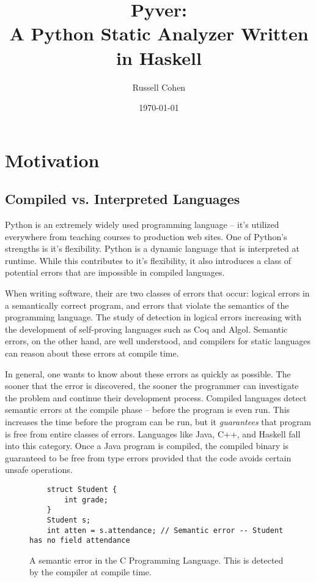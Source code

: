 \documentclass{article}[12pt]
\author{Russell Cohen}
\title{Pyver: \\ A Python Static Analyzer Written in Haskell}
\date{\today}
\begin{document}
\renewcommand{\theFancyVerbLine}{
      \sffamily\textcolor[rgb]{0.5,0.5,0.5}{\scriptsize\arabic{FancyVerbLine}}}

\maketitle
\section{Motivation}

\subsection{Compiled vs. Interpreted Languages}
\doublespacing
Python is an extremely widely used programming language -- it's utilized everywhere from teaching courses to production
web sites. One of Python's strengths is it's flexibility. Python is a dynamic language that is
interpreted at runtime. While this contributes to it's flexibility, it also introduces a class of
potential errors that are impossible in compiled languages.

When writing software, their are two classes of errors that occur: logical errors in a semantically
correct program, and errors that violate the semantics of the programming language. The study of
detection in logical errors increasing with the development of self-proving languages such as Coq
and Algol. Semantic errors, on the other hand, are well understood, and compilers for static
languages can reason about these errors at compile time. 

In general, one wants to know about these errors as quickly as possible. The sooner that the error
is discovered, the sooner the programmer can investigate the problem and continue their development
process. Compiled languages detect semantic errors at the compile phase -- before the program is
even run. This increases the time before the program can be run, but it \emph{guarantees} that
program is free from entire classes of errors. Languages like Java, C++, and Haskell fall into this
category. Once a Java program is compiled, the compiled binary is guaranteed to be free from type
errors provided that the code avoids certain unsafe operations. 
\begin{figure}
\begin{verbatim}
    struct Student {
        int grade;
    }
    Student s;
    int atten = s.attendance; // Semantic error -- Student has no field attendance
\end{verbatim}
\caption{A semantic error in the C Programming Language. This is detected by the compiler at compile
time.}
\end{figure}
\end{document}
